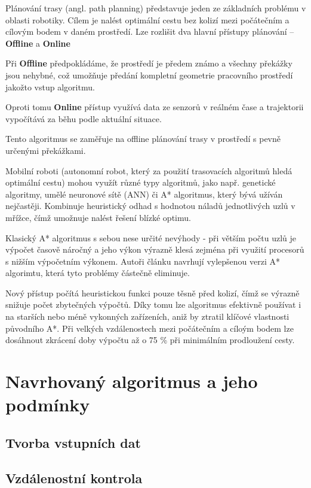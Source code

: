 \documentclass[10pt, a4paper]{article}
\begin{document}
Plánování trasy (angl. path planning) představuje jeden ze základních problému v oblasti robotiky. Cílem je nalést optimální cestu bez kolizí mezi počátečním a cílovým bodem v daném prostředí. Lze rozlišit dva hlavní přístupy plánování – \textbf{Offline} a \textbf{Online}

Při \textbf{Offline} předpokládáme, že prostředí je předem známo a všechny překážky jsou nehybné, což umožňuje předání kompletní geometrie pracovního prostředí jakožto vstup algoritmu.

Oproti tomu \textbf{Online} přístup využívá data ze senzorů v reálném čase a trajektorii vypočítává za běhu podle aktuální situace.

Tento algoritmus se zaměřuje na offline plánování trasy v prostředí s pevně určenými překážkami.

Mobilní roboti (autonomní robot, který za použití trasovacích algoritmů hledá optimální cestu) mohou využít různé typy algoritmů, jako např. genetické algoritmy, umělé neuronové sítě (ANN) či A* algoritmus, který bývá užíván nejčastěji. Kombinuje heuristický odhad s hodnotou náladů jednotlivých uzlů v mřížce, čímž umožnuje nalést řešení blízké optimu.

Klasický A* algoritmus s sebou nese určité nevýhody - při větším počtu uzlů je výpočet časově náročný a jeho výkon výrazně klesá zejména při využití procesorů s nižším výpočetním výkonem. Autoři článku navrhují vylepšenou verzi A* algorimtu, která tyto problémy částečně eliminuje.

Nový přístup počítá heuristickou funkci pouze těsně před kolizí, čímž se výrazně snižuje počet zbytečných výpočtů. Díky tomu lze algoritmus efektivně používat i na starších nebo méně vykonných zařízeních, aniž by ztratil klíčové vlastnosti původního A*.
Při velkých vzdálenostech mezi počátečním a cíloým bodem lze dosáhnout zkrácení doby výpočtu až o 75 \% při minimálním prodloužení cesty.


\section{Navrhovaný algoritmus a jeho podmínky}

\subsection{Tvorba vstupních dat}

\subsection{Vzdálenostní kontrola}
\end{document}
